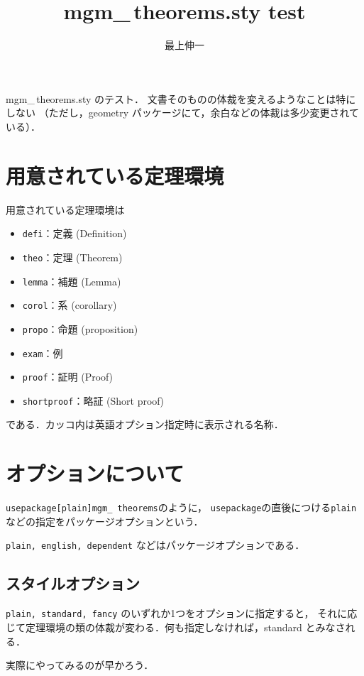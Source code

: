 \documentclass{jsarticle}
\title{mgm\_\,theorems.sty test}
\author{最上伸一}
\begin{document}
\maketitle

mgm\_\,theorems.sty のテスト．
文書そのものの体裁を変えるようなことは特にしない
（ただし，geometry パッケージにて，余白などの体裁は多少変更されている）．

\section{用意されている定理環境}
用意されている定理環境は
\begin{itemize}
\item \texttt{defi}：定義 (Definition)
\item \texttt{theo}：定理 (Theorem)
\item \texttt{lemma}：補題 (Lemma)
\item \texttt{corol}：系 (corollary)
\item \texttt{propo}：命題 (proposition)
\item \texttt{exam}：例
\item \texttt{proof}：証明 (Proof)
\item \texttt{shortproof}：略証 (Short proof)
\end{itemize} 
である．カッコ内は英語オプション指定時に表示される名称．

\section{オプションについて}
\begin{defi}[パッケージオプション]
\texttt{\yen usepackage[plain]{mgm\_\,theorems}}のように，
\texttt{usepackage}の直後につける\texttt{plain}などの指定をパッケージオプションという．
\end{defi}
\begin{exam}
\texttt{plain, english, dependent} などはパッケージオプションである．
\end{exam}

\subsection{スタイルオプション}
\begin{theo}[スタイルオプション]
\texttt{plain, standard, fancy} のいずれか1つをオプションに指定すると，
それに応じて定理環境の類の体裁が変わる．何も指定しなければ，standard とみなされる．
\end{theo}
\begin{shortproof}
実際にやってみるのが早かろう．
\end{shortproof}
\end{document}
